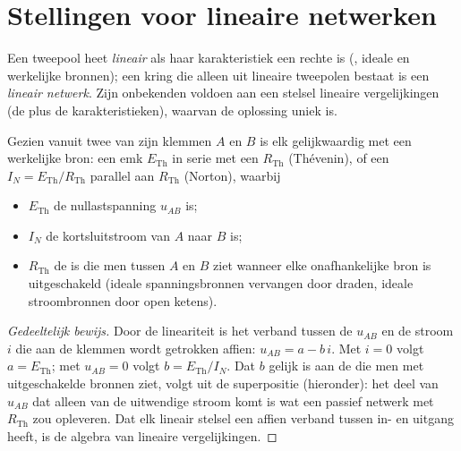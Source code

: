 \section{Stellingen voor lineaire netwerken}

\begin{definition}\label{def:b1:dc-circuits:linear}
Een tweepool heet \emph{lineair} als haar karakteristiek een rechte is
(, ideale en werkelijke bronnen); een kring die alleen uit lineaire
tweepolen bestaat is een \emph{lineair netwerk}. Zijn onbekenden voldoen aan een
stelsel lineaire vergelijkingen (de  plus de
karakteristieken), waarvan de oplossing uniek is.
\end{definition}

\begin{theorem}\label{thm:b1:dc-circuits:thevenin}
Gezien vanuit twee van zijn klemmen $A$ en $B$ is elk 
gelijkwaardig met een werkelijke bron: een emk $E_{\mathrm{Th}}$ in serie met een
 $R_{\mathrm{Th}}$ (Thévenin), of een  $I_N =
E_{\mathrm{Th}}/R_{\mathrm{Th}}$ parallel aan $R_{\mathrm{Th}}$
(Norton), waarbij
\begin{itemize}
  \item $E_{\mathrm{Th}}$ de nullastspanning $u_{AB}$ is;
  \item $I_N$ de kortsluitstroom van $A$ naar $B$ is;
  \item $R_{\mathrm{Th}}$ de  is die men tussen $A$ en $B$ ziet
        wanneer elke onafhankelijke bron is uitgeschakeld (ideale
        spanningsbronnen vervangen door draden, ideale stroombronnen door
        open ketens).
\end{itemize}
\end{theorem}

\begin{proof}[Gedeeltelijk bewijs]
Door de lineariteit is het verband tussen de  $u_{AB}$ en de stroom
$i$ die aan de klemmen wordt getrokken affien: $u_{AB} = a - b\,i$. Met
$i = 0$ volgt $a = E_{\mathrm{Th}}$; met $u_{AB} = 0$ volgt
$b = E_{\mathrm{Th}}/I_N$. Dat $b$ gelijk is aan de  die men met
uitgeschakelde bronnen ziet, volgt uit de superpositie (hieronder): het deel van $u_{AB}$
dat alleen van de uitwendige stroom komt is wat een passief netwerk met
 $R_{\mathrm{Th}}$ zou opleveren. Dat elk lineair stelsel een
affien verband tussen in- en uitgang heeft, is de algebra van lineaire vergelijkingen.
\end{proof}

